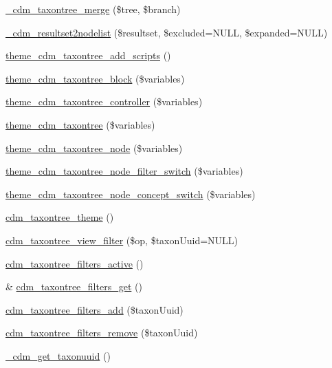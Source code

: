 \begin{DoxyCompactItemize}
\item 
\hyperlink{cdm__taxontree_8module_ae97ba8d03d4e376524b1bee37f91bb24}{\-\_\-cdm\-\_\-taxontree\-\_\-merge} (\$tree, \$branch)
\item 
\hyperlink{cdm__taxontree_8module_a5454af21fe50af760a79e7231dcebfc1}{\-\_\-cdm\-\_\-resultset2nodelist} (\$resultset, \$excluded=N\-U\-L\-L, \$expanded=N\-U\-L\-L)
\item 
\hyperlink{cdm__taxontree_8module_a965a3172ff1d3e21a8396984cff1a375}{theme\-\_\-cdm\-\_\-taxontree\-\_\-add\-\_\-scripts} ()
\item 
\hyperlink{cdm__taxontree_8module_accc66f59ad19450b03cf4325f815aecb}{theme\-\_\-cdm\-\_\-taxontree\-\_\-block} (\$variables)
\item 
\hyperlink{cdm__taxontree_8module_a1f981d74bee761838367e099b662fe97}{theme\-\_\-cdm\-\_\-taxontree\-\_\-controller} (\$variables)
\item 
\hyperlink{cdm__taxontree_8module_ad0d84031fef82aceaecff9adca67ab8e}{theme\-\_\-cdm\-\_\-taxontree} (\$variables)
\item 
\hyperlink{cdm__taxontree_8module_a030259b362a7f75d6d6cac2d5eec376c}{theme\-\_\-cdm\-\_\-taxontree\-\_\-node} (\$variables)
\item 
\hyperlink{cdm__taxontree_8module_adc56299a54aaca55334358ca123fec31}{theme\-\_\-cdm\-\_\-taxontree\-\_\-node\-\_\-filter\-\_\-switch} (\$variables)
\item 
\hyperlink{cdm__taxontree_8module_a471d059ca1389ff8627fd76731966445}{theme\-\_\-cdm\-\_\-taxontree\-\_\-node\-\_\-concept\-\_\-switch} (\$variables)
\item 
\hyperlink{cdm__taxontree_8module_a68efc8068d0c99f80a2f231605a22554}{cdm\-\_\-taxontree\-\_\-theme} ()
\item 
\hyperlink{cdm__taxontree_8module_a54ab7c79956659111efae77c6bd91d74}{cdm\-\_\-taxontree\-\_\-view\-\_\-filter} (\$op, \$taxon\-Uuid=N\-U\-L\-L)
\item 
\hyperlink{cdm__taxontree_8module_a4b130c978fe0f28525c8b94b0de1ac2d}{cdm\-\_\-taxontree\-\_\-filters\-\_\-active} ()
\item 
\& \hyperlink{cdm__taxontree_8module_ad10de070a6469ea3c0a9b35b112e5fce}{cdm\-\_\-taxontree\-\_\-filters\-\_\-get} ()
\item 
\hyperlink{cdm__taxontree_8module_a1c9ee94c420e2d6e2f4dfc9c82e6a22c}{cdm\-\_\-taxontree\-\_\-filters\-\_\-add} (\$taxon\-Uuid)
\item 
\hyperlink{cdm__taxontree_8module_aba22e7b6a42ed22a917ac2066346c176}{cdm\-\_\-taxontree\-\_\-filters\-\_\-remove} (\$taxon\-Uuid)
\item 
\hyperlink{cdm__taxontree_8module_af452e08527caa892aa2b3f213f30bc90}{\-\_\-cdm\-\_\-get\-\_\-taxonuuid} ()
\end{DoxyCompactItemize}


